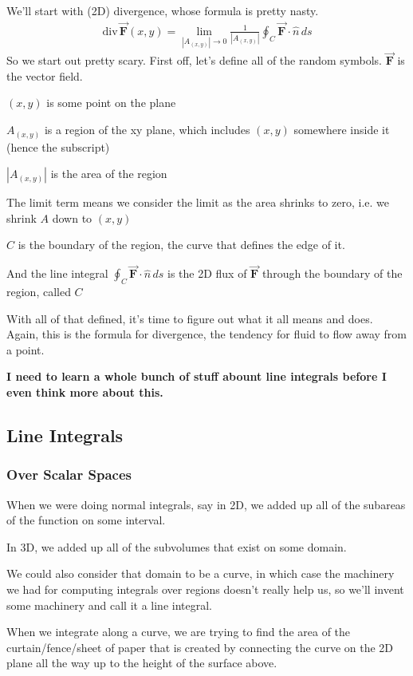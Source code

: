 \documentclass[12pt, letterpaper]{article}
\begin{document}
We'll start with (2D) divergence, whose formula is pretty nasty.
\begin{gather*}
    \text{div}\,\vec{\mathbf{F}}(x, y) = \lim_{\left| A_{(x, y)} \right| \to 0} \frac{1}{\left| A_{(x, y)} \right|} \oint_C \vec{\mathbf{F}} \cdot \hat{n}\, ds
\end{gather*}
So we start out pretty scary.
First off, let's define all of the random symbols.
$\vec{\mathbf{F}}$ is the vector field.

$(x, y)$ is some point on the plane

$A_{(x, y)}$ is a region of the xy plane, which includes $(x, y)$ somewhere inside it (hence the subscript)

$\left|A_{(x, y)}\right|$ is the area of the region

The limit term means we consider the limit as the area shrinks to zero, i.e. we shrink $A$ down to $(x, y)$

$C$ is the boundary of the region, the curve that defines the edge of it.

And the line integral $\oint_C \vec{\mathbf{F}} \cdot \hat{n}\, ds$ is the 2D flux of $\vec{\mathbf{F}}$ through the boundary of the region, called $C$

With all of that defined, it's time to figure out what it all means and does.
Again, this is the formula for divergence, the tendency for fluid to flow away from a point.

\textbf{I need to learn a whole bunch of stuff abount line integrals before I even think more about this.}


\subsection{Line Integrals}
\subsubsection{Over Scalar Spaces}
When we were doing normal integrals, say in 2D, we added up all of the subareas of the function on some interval.

In 3D, we added up all of the subvolumes that exist on some domain.

We could also consider that domain to be a curve, in which case the machinery we had for computing integrals over regions doesn't really help us, so we'll invent some machinery and call it a line integral.

When we integrate along a curve, we are trying to find the area of the curtain/fence/sheet of paper that is created by connecting the curve on the 2D plane
all the way up to the height of the surface above.
\end{document}
